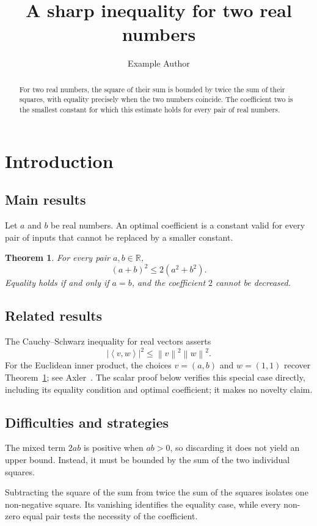 \documentclass[a4paper,11pt,reqno]{amsart}
\title{A sharp inequality for two real numbers}
\author{Example Author}
\date{}
\newcommand{\R}{\mathbb{R}}
\newcommand{\abs}[1]{\left\lvert#1\right\rvert}
\newcommand{\norm}[1]{\left\lVert#1\right\rVert}
\newcommand{\inner}[2]{\left\langle#1,#2\right\rangle}
\numberwithin{equation}{section}
\theoremstyle{plain}
\newtheorem{thm}{Theorem}[section]
\theoremstyle{definition}
\theoremstyle{remark}
\begin{document}
\begin{abstract}
For two real numbers, the square of their sum is bounded by twice the sum of their squares, with equality precisely when the two numbers coincide. The coefficient two is the smallest constant for which this estimate holds for every pair of real numbers.
\end{abstract}
\maketitle

\section{Introduction}

\subsection{Main results}
Let $a$ and $b$ be real numbers. An optimal coefficient is a constant valid for every pair of inputs that cannot be replaced by a smaller constant.
\begin{thm}\label{thm:sum}
For every pair $a,b\in\R$,
\[
 (a+b)^2\leq 2(a^2+b^2).
\]
Equality holds if and only if $a=b$, and the coefficient $2$ cannot be decreased.
\end{thm}

\subsection{Related results}
The Cauchy--Schwarz inequality for real vectors asserts
\[
 \abs{\inner{v}{w}}^2\leq\norm{v}^2\norm{w}^2.
\]
For the Euclidean inner product, the choices $v=(a,b)$ and $w=(1,1)$ recover Theorem~\ref{thm:sum}; see Axler~\cite[Theorem~6.14 and Example~6.16(a)]{axler}. The scalar proof below verifies this special case directly, including its equality condition and optimal coefficient; it makes no novelty claim.

\subsection{Difficulties and strategies}
The mixed term $2ab$ is positive when $ab>0$, so discarding it does not yield an upper bound. Instead, it must be bounded by the sum of the two individual squares.

Subtracting the square of the sum from twice the sum of the squares isolates one non-negative square. Its vanishing identifies the equality case, while every non-zero equal pair tests the necessity of the coefficient.
\end{document}
